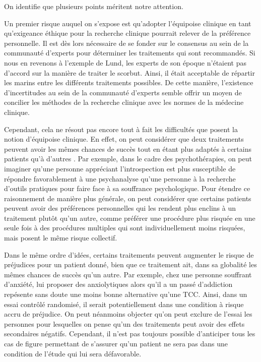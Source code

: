 \documentclass[
  12pt,
]{book}
\begin{document}
On identifie que plusieurs points méritent notre attention.

Un premier risque auquel on s'expose est qu'adopter l'équipoise clinique en tant qu'exigeance éthique pour la recherche clinique pourrait relever de la préférence personnelle. Il est dès lors nécessaire de se fonder sur le consensus au sein de la communauté d'experts pour déterminer les traitements qui sont recommandés. Si nous en revenons à l'exemple de Lund, les experts de son époque n'étaient pas d'accord sur la manière de traiter le scorbut. Ainsi, il était acceptable de répartir les marins entre les différents traitements possibles. De cette manière, l'existence d'incertitudes au sein de la communauté d'experts semble offrir un moyen de concilier les méthodes de la recherche clinique avec les normes de la médecine clinique.

Cependant, cela ne résout pas encore tout à fait les difficultés que posent la notion d'équipoise clinique. En effet, on peut considérer que deux traitements peuvent avoir les mêmes chances de succès tout en étant plus adaptés à certains patients qu'à d'autres \citep{Gifford2007}. Par exemple, dans le cadre des psychothérapies, on peut imaginer qu'une personne appréciant l'introspection est plus susceptible de répondre favorablement à une psychanalyse qu'une personne à la recherche d'outils pratiques pour faire face à sa souffrance psychologique. Pour étendre ce raisonnement de manière plus générale, on peut considérer que certains patients peuvent avoir des préférences personnelles qui les rendent plus enclins à un traitement plutôt qu'un autre, comme préférer une procédure plus risquée en une seule fois à des procédures multiples qui sont individuellement moins risquées, mais posent le même risque collectif.

Dans le même ordre d'idées, certains traitements peuvent augmenter le risque de préjudices pour un patient donné, bien que ce traitement ait, dans sa globalité les mêmes chances de succès qu'un autre. Par exemple, chez une personne souffrant d'anxiété, lui proposer des anxiolytiques alors qu'il a un passé d'addiction repésente sans doute une moins bonne alternative qu'une TCC. Ainsi, dans un essai contrôlé randomisé, il serait potentiellement dans une condition à risque accru de préjudice. On peut néanmoins objecter qu'on peut exclure de l'essai les personnes pour lesquelles on pense qu'un des traitements peut avoir des effets secondaires négatifs. Cependant, il n'est pas toujours possible d'anticiper tous les cas de figure permettant de s'assurer qu'un patient ne sera pas dans une condition de l'étude qui lui sera défavorable.
\end{document}
